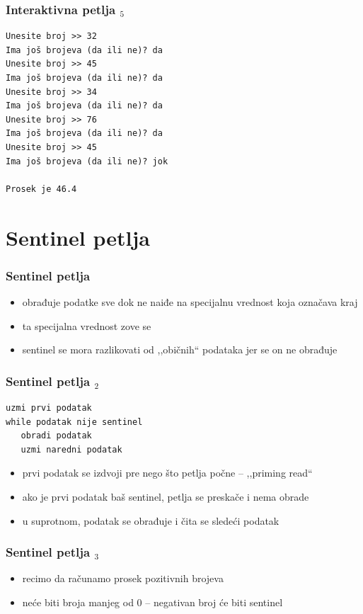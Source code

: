 \documentclass[utf8,compress]{beamer}
\begin{document}
\begin{frame}[fragile]
  \frametitle{Interaktivna petlja $_5$}
\begin{verbatim}
Unesite broj >> 32
Ima još brojeva (da ili ne)? da
Unesite broj >> 45
Ima još brojeva (da ili ne)? da
Unesite broj >> 34
Ima još brojeva (da ili ne)? da
Unesite broj >> 76
Ima još brojeva (da ili ne)? da
Unesite broj >> 45
Ima još brojeva (da ili ne)? jok

Prosek je 46.4
\end{verbatim}
\end{frame}

\section[Sentinel]{Sentinel petlja}

\begin{frame}[fragile]
  \frametitle{Sentinel petlja}
  \begin{itemize}
    \item {} obrađuje podatke sve dok ne naiđe na specijalnu vrednost koja označava kraj
    \item ta specijalna vrednost zove se 
    \item sentinel se mora razlikovati od ,,običnih`` podataka jer se on ne obrađuje
  \end{itemize}
\end{frame}

\begin{frame}[fragile]
  \frametitle{Sentinel petlja $_2$}
\begin{verbatim}
uzmi prvi podatak
while podatak nije sentinel
   obradi podatak
   uzmi naredni podatak
\end{verbatim}
  \begin{itemize}
    \item prvi podatak se izdvoji pre nego što petlja počne -- ,,priming read``
    \item ako je prvi podatak baš sentinel, petlja se preskače i nema obrade
    \item u suprotnom, podatak se obrađuje i čita se sledeći podatak
  \end{itemize}
\end{frame}

\begin{frame}[fragile]
  \frametitle{Sentinel petlja $_3$}
  \begin{itemize}
    \item recimo da računamo prosek pozitivnih brojeva
    \item neće biti broja manjeg od 0 -- negativan broj će biti sentinel
  \end{itemize}
\end{frame}
\end{document}
